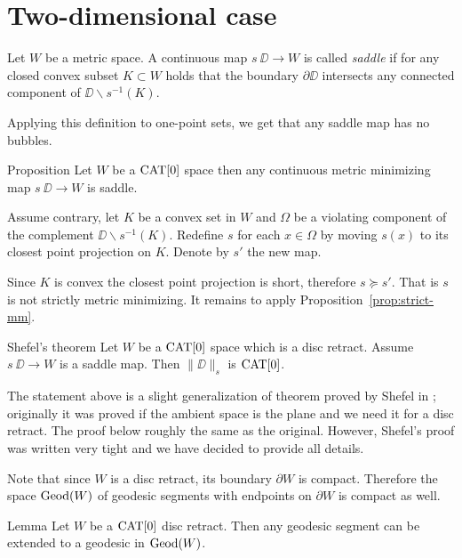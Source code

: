 \documentclass[a4paper,10pt]{amsart}
\begin{document}
\section{Two-dimensional case}

Let $W$ be a metric space.
A continuous map $s\:\DD\to W$ is called \emph{saddle} if for any closed convex subset $K\subset W$ holds that
the boundary $\partial \DD$ intersects
any connected component of $\DD\backslash s^{-1}(K)$.

Applying this definition to one-point sets,
we get that any saddle map has no bubbles.


\begin{thm}{Proposition}
Let $W$ be a $\mathop{\rm CAT}\nolimits[0]$ space then any continuous metric minimizing map $s\:\DD\to W$ is saddle.
\end{thm}

Assume contrary, let $K$ be a convex set in $W$
and $\Omega$ be a violating component of the complement $\DD\backslash s^{-1}(K)$.
Redefine $s$ for each $x\in\Omega$ by moving 
$s(x)$ to its closest point projection on $K$.
Denote by $s'$ the new map.

Since $K$ is convex the closest point projection is short,
therefore $s\succcurlyeq s'$.
That is $s$ is not strictly metric minimizing.
It remains to apply Proposition~\ref{prop:strict-mm}.
\qeds

 






\begin{thm}{Shefel's theorem}\label{thm:shefel-2D}
Let $W$ be a $\mathop{\rm CAT}\nolimits[0]$ space which is a disc retract.
Assume $s\:\DD\to W$ is a saddle map. 
Then $\|\DD\|_s$ is $\mathop{\rm CAT}\nolimits[0]$.
\end{thm}

The statement above is a slight generalization of theorem proved by Shefel in \cite{shefel-2D};
originally it was proved if the ambient space is the plane and we need it for a disc retract.
The proof below roughly the same as the original.
However, Shefel's proof was written very tight
and we have decided to provide all details.


Note that since $W$ is a disc retract, its boundary $\partial W$ is compact. Therefore
the space $\mathop{\rm Geod}\nolimits(W)$ of geodesic segments with endpoints on $\partial W$ is compact as well.

\begin{thm}{Lemma}\label{lem:extension}
Let $W$ be a $\mathop{\rm CAT}\nolimits[0]$  disc retract. Then any geodesic segment can be extended to a geodesic in $\mathop{\rm Geod}\nolimits(W)$.
\end{thm}
\end{document}
